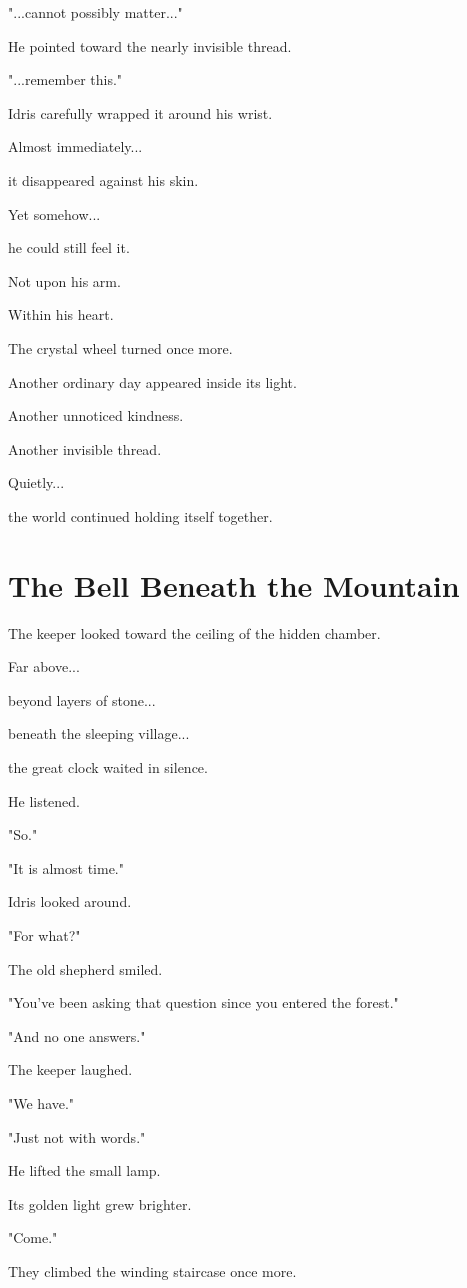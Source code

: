 \documentclass[12pt,openany]{book}
\begin{document}
"...cannot possibly matter..."

He pointed toward the nearly invisible thread.

"...remember this."

Idris carefully wrapped it around his wrist.

Almost immediately...

it disappeared against his skin.

Yet somehow...

he could still feel it.

Not upon his arm.

Within his heart.

The crystal wheel turned once more.

Another ordinary day appeared inside its light.

Another unnoticed kindness.

Another invisible thread.

Quietly...

the world continued holding itself together.
\section*{The Bell Beneath the Mountain}

The keeper looked toward the ceiling of the hidden chamber.

Far above...

beyond layers of stone...

beneath the sleeping village...

the great clock waited in silence.

He listened.

"So."

"It is almost time."

Idris looked around.

"For what?"

The old shepherd smiled.

"You've been asking that question since you entered the forest."

"And no one answers."

The keeper laughed.

"We have."

"Just not with words."

He lifted the small lamp.

Its golden light grew brighter.

"Come."

They climbed the winding staircase once more.
\end{document}
